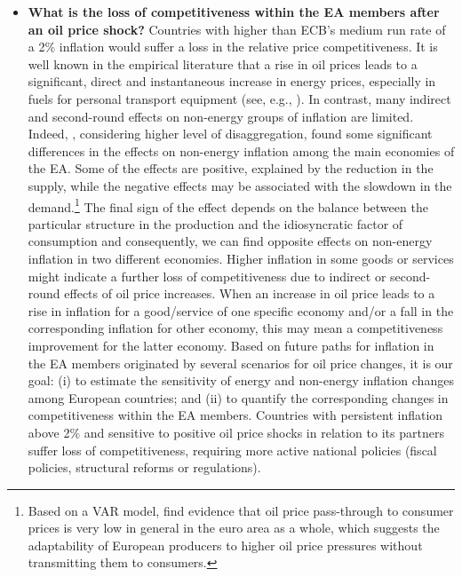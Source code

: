 \documentclass{article}\usepackage[]{graphicx}\usepackage[]{color}
\begin{document}
\begin{itemize}
\item \textbf{What is the loss of competitiveness within the EA members after an oil price shock?} Countries with higher than ECB's medium run rate of a 2\% inflation would suffer a loss in the relative price competitiveness. It is well known in the empirical literature that a rise in oil prices leads to a significant, direct and instantaneous increase in energy prices, especially in fuels for personal transport equipment (see, e.g., \citealp{Alvarez2011}). In contrast, many indirect and second-round effects on non-energy groups of inflation are limited. Indeed, \cite{Castro2016a}, considering higher level of disaggregation, found some significant differences in the effects on non-energy inflation among the main economies of the EA. Some of the effects are positive, explained by the reduction in the supply, while the negative effects may be associated with the slowdown in the demand.\footnote{Based on a VAR model, \cite{Castro2016b} find evidence that oil price pass-through to consumer prices is very low in general in the euro area as a whole, which suggests the adaptability of European producers to higher oil price pressures without transmitting them to consumers.} The final sign of the effect depends on the balance between the particular structure in the production and the idiosyncratic factor of consumption and consequently, we can find opposite effects on non-energy inflation in two different economies. Higher inflation in some goods or services might indicate a further loss of competitiveness due to indirect or second-round effects of oil price increases. When an increase in oil price leads to a rise in inflation for a good/service of one specific economy and/or a fall in the corresponding inflation for other economy, this may mean a competitiveness improvement for the latter economy. Based on future paths for inflation in the EA members originated by several scenarios for oil price changes, it is our goal: (i) to estimate the sensitivity of energy and non-energy inflation changes among European countries; and (ii) to quantify the corresponding changes in competitiveness within the EA members. Countries with persistent inflation above 2\% and sensitive to positive oil price shocks in relation to its partners suffer loss of competitiveness, requiring more active national policies (fiscal policies, structural reforms or regulations).


\end{itemize}
\end{document}
